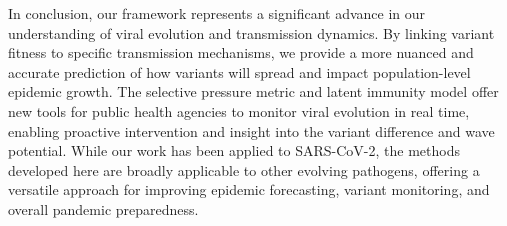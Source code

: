 \documentclass[12pt,oneside,letterpaper]{article}
\begin{document}


%


In conclusion, our framework represents a significant advance in our understanding of viral evolution and transmission dynamics.
By linking variant fitness to specific transmission mechanisms, we provide a more nuanced and accurate prediction of how variants will spread and impact population-level epidemic growth.
The selective pressure metric and latent immunity model offer new tools for public health agencies to monitor viral evolution in real time, enabling proactive intervention and insight into the variant difference and wave potential.
While our work has been applied to SARS-CoV-2, the methods developed here are broadly applicable to other evolving pathogens, offering a versatile approach for improving epidemic forecasting, variant monitoring, and overall pandemic preparedness.
\end{document}
